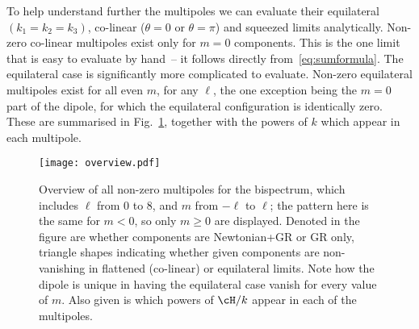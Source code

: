 To help understand further the multipoles we can evaluate their equilateral $(k_1=k_2=k_3)$, co-linear   ($\theta=0$ or $\theta=\pi$) and squeezed limits analytically.  
Non-zero co-linear multipoles exist only for \(m=0\) components. This is the one limit that is easy to evaluate by hand~-- it follows directly from~\eqref{eq:sumformula}. 
The equilateral case is significantly more complicated to evaluate.
Non-zero equilateral multipoles exist for all even \(m\), for any $\ell$, the one exception being the \(m=0\) part of the dipole, for which the equilateral configuration is identically zero. These are summarised in Fig.~\ref{fig:blm_overview}, together with the powers of $k$ which appear in each multipole.
\begin{figure}[H]
\centering
\texttt{[image: overview.pdf]}
\caption{Overview of all non-zero multipoles for the bispectrum, which includes \(\ell\) from 0 to 8, and \(m\) from \(-\ell\) to \(\ell\); the pattern here is the same for \(m < 0\), so only $m \geq 0$ are displayed. Denoted in the figure are whether components are Newtonian+GR or GR only, triangle shapes indicating whether given components are non-vanishing in flattened (co-linear) or equilateral limits. Note how the dipole is unique in having the equilateral case vanish for every value of \(m\). Also given is which powers of \(\cH/k\) appear in each of the multipoles. \label{fig:blm_overview}}
\end{figure}

